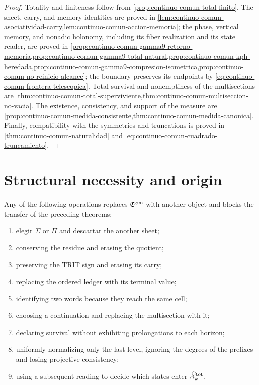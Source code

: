 \begin{proof}
Totality and finiteness follow from \cref{prop:continuo-comun-total-finito}. The sheet, carry, and memory identities are proved in \cref{lem:continuo-comun-asociatividad-carry,lem:continuo-comun-accion-memoria}; the phase, vertical memory, and nonadic holonomy, including its fiber realization and its state reader, are proved in \cref{prop:continuo-comun-gamma9-retorno-memoria,prop:continuo-comun-gamma9-total-natural,prop:continuo-comun-kph-heredada,prop:continuo-comun-gamma9-compresion-isometrica,prop:continuo-comun-no-reinicio-alcance}; the boundary preserves its endpoints by \eqref{eq:continuo-comun-frontera-telescopica}. Total survival and nonemptiness of the multisections are \cref{thm:continuo-comun-total-superviviente,thm:continuo-comun-multiseccion-no-vacia}. The existence, consistency, and support of the measure are \cref{prop:continuo-comun-medida-consistente,thm:continuo-comun-medida-canonica}. Finally, compatibility with the symmetries and truncations is proved in \cref{thm:continuo-comun-naturalidad} and \eqref{eq:continuo-comun-cuadrado-truncamiento}.
\end{proof}

\section{Structural necessity and origin}
\label{sec:continuo-comun-falsadores}

\begin{proposition}
\label{prop:continuo-comun-falsadores}
Any of the following operations replaces
\(\mathfrak C^{\rm gen}\) with another object and blocks the transfer of the
preceding theorems:
\begin{enumerate}
 \item elegir \(\Sigma\) or \(\Pi\) and descartar the another sheet;
 \item conserving the residue and erasing the quotient;
 \item preserving the TRIT sign and erasing its carry;
 \item replacing the ordered ledger with its terminal value;
 \item identifying two words because they reach the same cell;
 \item choosing a continuation and replacing the multisection with it;
 \item declaring survival without exhibiting prolongations to each horizon;
 \item uniformly normalizing only the last level, ignoring the degrees of
       the prefixes and losing projective consistency;
 \item using a subsequent reading to decide which states enter
       \(\widehat{\mathcal X}^{\rm tot}_k\).
\end{enumerate}
\end{proposition}

